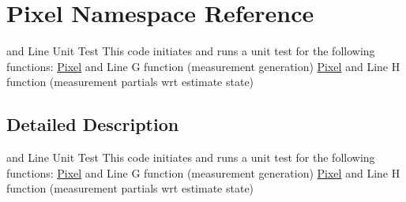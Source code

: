 \hypertarget{namespacePixel}{}\section{Pixel Namespace Reference}
\label{namespacePixel}


and Line Unit Test This code initiates and runs a unit test for the following functions\+: \hyperlink{namespacePixel}{Pixel} and Line G function (measurement generation) \hyperlink{namespacePixel}{Pixel} and Line H function (measurement partials wrt estimate state)  




\subsection{Detailed Description}
and Line Unit Test This code initiates and runs a unit test for the following functions\+: \hyperlink{namespacePixel}{Pixel} and Line G function (measurement generation) \hyperlink{namespacePixel}{Pixel} and Line H function (measurement partials wrt estimate state) 